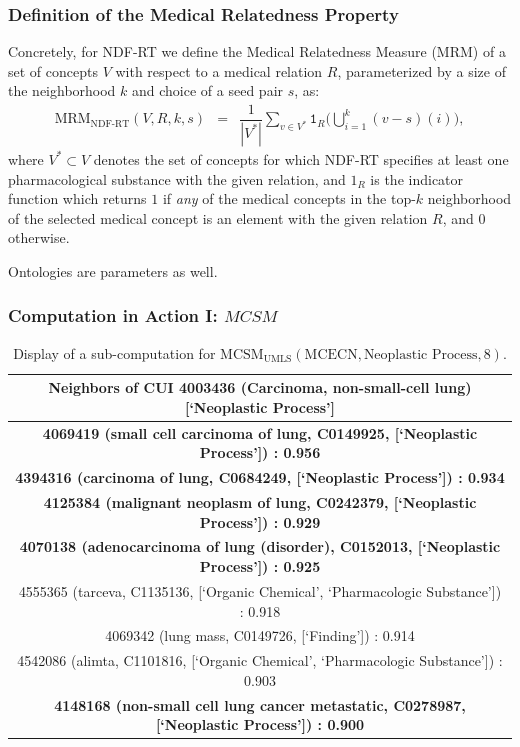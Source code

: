 \documentclass{beamer}
\newcommand\T{\rule{0pt}{2.6ex}}       %
\newcommand\B{\rule[-1.2ex]{0pt}{0pt}} %
\begin{document}
\begin{frame}
\frametitle{Definition of 
the Medical Relatedness Property}
Concretely, for NDF-RT we define the Medical Relatedness Measure (MRM) of a set
of concepts $V$ 
with respect to a medical relation $R$, parameterized by
a size of the neighborhood $k$ and choice of a seed pair $s$, as: %
\begin{eqnarray*}
\text{MRM}_{\text{NDF-RT}}(V,R,k,s) &=& \dfrac{1}{|V^*|}\sum_{v \in V^*} \mathtt{1}_{R}\Big(\bigcup_{i=1}^{k}(v-s)(i)\Big),
\end{eqnarray*}
where $V^*\subset V$ denotes the set of concepts for which NDF-RT
specifies at least one pharmacological substance with the given
relation, and $1_{R}$ is the indicator function which returns $1$ if
{\em any} of the medical concepts in the top-$k$ neighborhood of the
selected medical concept is an element with the given relation $R$, and  
$0$ otherwise. 
\end{frame}

\begin{frame}
\centering
Ontologies are parameters as well.
\end{frame}

\begin{frame}
\frametitle{Computation in Action I: $MCSM$}
\begin{table}[h!]
\caption{\centering
\scriptsize Display of a sub-computation for$\text{ MCSM}_{\text{UMLS}}(\text{MCECN},\text{Neoplastic Process}, 8)$.}
{
\tiny
\begin{center}
\begin{tabular}{|c|}
\hline
Neighbors of CUI 4003436 (Carcinoma, non-small-cell lung) [`Neoplastic Process'] 
\T \B \\ 
\hline
\textbf{4069419 (small cell carcinoma of lung, C0149925,  [`Neoplastic Process']) : 0.956} \T \B \\
\textbf{4394316 (carcinoma of lung, C0684249,  [`Neoplastic Process']) : 0.934} 
\T \B \\
\textbf{4125384 (malignant neoplasm of lung, C0242379,  [`Neoplastic Process']) : 0.929} \T \B \\
\textbf{4070138 (adenocarcinoma of lung (disorder), C0152013,  [`Neoplastic Process']) : 0.925} \T \B \\
4555365 (tarceva, C1135136,  [`Organic Chemical', `Pharmacologic Substance']) : 0.918 \T \B \\
4069342 (lung mass, C0149726,  [`Finding']) : 0.914 \T \B \\
4542086 (alimta, C1101816,  [`Organic Chemical', `Pharmacologic Substance']) : 0.903 \T \B \\
\textbf{4148168 (non-small cell lung cancer metastatic, C0278987,  [`Neoplastic Process']) : 0.900} \T \B \\
\hline
\end{tabular}
\end{center}
}
\end{table}
\end{frame}
\end{document}
